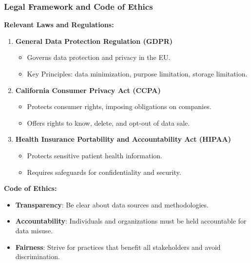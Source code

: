 \documentclass[aspectratio=169]{beamer}
\begin{document}
\begin{frame}[fragile]
    \frametitle{Legal Framework and Code of Ethics}
    \textbf{Relevant Laws and Regulations:}
    \begin{enumerate}
        \item \textbf{General Data Protection Regulation (GDPR)}
            \begin{itemize}
                \item Governs data protection and privacy in the EU.
                \item Key Principles: data minimization, purpose limitation, storage limitation.
            \end{itemize}
        \item \textbf{California Consumer Privacy Act (CCPA)}
            \begin{itemize}
                \item Protects consumer rights, imposing obligations on companies.
                \item Offers rights to know, delete, and opt-out of data sale.
            \end{itemize}
        \item \textbf{Health Insurance Portability and Accountability Act (HIPAA)}
            \begin{itemize}
                \item Protects sensitive patient health information.
                \item Requires safeguards for confidentiality and security.
            \end{itemize}
    \end{enumerate}
    
    \textbf{Code of Ethics:}
    \begin{itemize}
        \item \textbf{Transparency}: Be clear about data sources and methodologies.
        \item \textbf{Accountability}: Individuals and organizations must be held accountable for data misuse.
        \item \textbf{Fairness}: Strive for practices that benefit all stakeholders and avoid discrimination.
    \end{itemize}
\end{frame}
\end{document}
